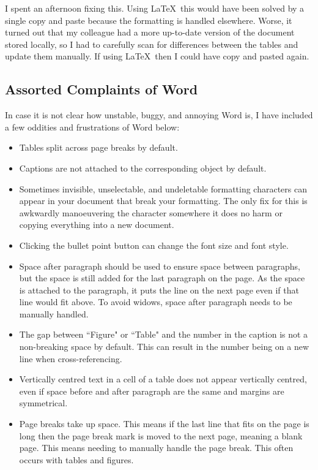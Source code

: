 I spent an afternoon fixing this. Using \LaTeX\ this would have been solved by a single copy and paste because the formatting is handled elsewhere. Worse, it turned out that my colleague had a more up-to-date version of the document stored locally, so I had to carefully scan for differences between the tables and update them manually. If using \LaTeX\ then I could have copy and pasted again.

\subsection{Assorted Complaints of Word}

In case it is not clear how unstable, buggy, and annoying Word is, I have included a few oddities and frustrations of Word below:

\begin{itemize}
	\item Tables split across page breaks by default.
	\item Captions are not attached to the corresponding object by default.
	\item Sometimes invisible, unselectable, and undeletable formatting characters can appear in your document that break your formatting. The only fix for this is awkwardly manoeuvering the character somewhere it does no harm or copying everything into a new document.
	\item Clicking the bullet point button can change the font size and font style.
	\item Space after paragraph should be used to ensure space between paragraphs, but the space is still added for the last paragraph on the page. As the space is attached to the paragraph, it puts the line on the next page even if that line would fit above. To avoid widows, space after paragraph needs to be manually handled.
	\item The gap between ``Figure" or ``Table" and the number in the caption is not a non-breaking space by default. This can result in the number being on a new line when cross-referencing.
	\item Vertically centred text in a cell of a table does not appear vertically centred, even if space before and after paragraph are the same and margins are symmetrical.
	\item Page breaks take up space. This means if the last line that fits on the page is long then the page break mark is moved to the next page, meaning a blank page. This means needing to manually handle the page break. This often occurs with tables and figures.

\end{itemize}
